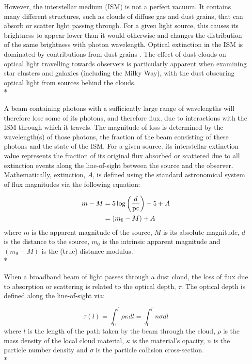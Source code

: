 \documentclass[12pt, a4paper]{report}
\begin{document}
However, the interstellar medium (ISM) is not a perfect vacuum. It contains many different structures, such as clouds of diffuse gas and dust grains, that can absorb or scatter light passing through. For a given light source, this causes its brightness to appear lower than it would otherwise and changes the distribution of the same brightness with photon wavelength. Optical extinction in the ISM is dominated by contributions from dust grains \citep{2016Ap.....59..548G}. The effect of dust clouds on optical light travelling towards observers is particularly apparent when examining star clusters and galaxies (including the Milky Way), with the dust obscuring optical light from sources behind the clouds. \\*

A beam containing photons with a sufficiently large range of wavelengths will therefore lose some of its photons, and therefore flux, due to interactions with the ISM through which it travels. The magnitude of loss is determined by the wavelength(s) of those photons, the fraction of the beam consisting of these photons and the state of the ISM. For a given source, its interstellar extinction value represents the fraction of its original flux absorbed or scattered due to all extinction events along the line-of-sight between the source and the observer. Mathematically, extinction, $A$, is defined using the standard astronomical system of flux magnitudes via the following equation:

\begin{align}
\begin{split}
m - M &= 5\log\left(\frac{d}{\textnormal{pc}}\right) - 5 + A \\
      &= (m_{0} - M) + A
\end{split}
\label{ext_def_app_mag}
\end{align}
where $m$ is the apparent magnitude of the source, $M$ is its absolute magnitude, $d$ is the distance to the source, $m_{0}$ is the intrinsic apparent magnitude and $(m_{0} - M)$ is the (true) distance modulus. \\*


When a broadband beam of light passes through a dust cloud, the loss of flux due to absorption or scattering is related to the optical depth, $\tau$. The optical depth is defined along the line-of-sight via:

\begin{equation}
\tau(l) = \int_{0}^{l} \rho \kappa dl = \int_{0}^{l} n \sigma dl
\label{optical_depth}
\end{equation}
where $l$ is the length of the path taken by the beam through the cloud, $\rho$ is the mass density of the local cloud material, $\kappa$ is the material's opacity, $n$ is the particle number density and $\sigma$ is the particle collision cross-section.\\*
\end{document}
